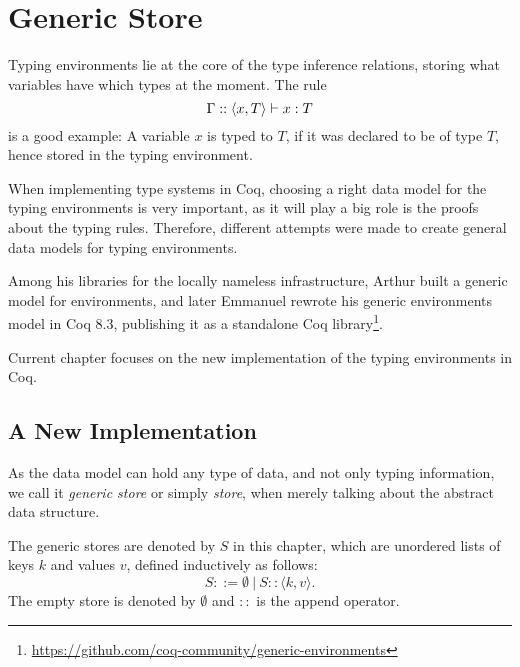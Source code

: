\section{Generic Store}\label{chap:generic-store}

\newcommand{\angkv}{\langle k, v \rangle}
\newcommand{\angkvp}{\langle k', v' \rangle}

Typing environments lie at the core of the type inference relations, storing what variables have which types at the moment. The rule
\[
\Gamma :: \left\langle x, T \right\rangle \vdash x : T
\]
is a good example: A variable $x$ is typed to $T$, if it was declared to be of type $T$, hence stored in the typing environment.

When implementing type systems in Coq, choosing a right data model for the typing environments is very important, as it will play a big role is the proofs about the typing rules. Therefore, different attempts were made to create general data models for typing environments.

Among his libraries for the locally nameless infrastructure, Arthur \cite{DBLP:journals/jar/Chargueraud12} built a generic model for environments, and later Emmanuel \cite{DBLP:journals/corr/abs-1112-1316} rewrote his generic environments model in Coq 8.3, publishing it as a standalone Coq library\footnote{\url{https://github.com/coq-community/generic-environments}}.



Current chapter focuses on the new implementation of the typing environments in Coq.

\subsection{A New Implementation}

As the data model can hold any type of data, and not only typing information, we call it \textit{generic store} or simply \textit{store}, when merely talking about the abstract data structure.

\begin{definition}
The generic stores are denoted by $S$ in this chapter, which are unordered lists of keys $k$ and values $v$, defined inductively as follows:
\begin{equation*}
S ::= \emptyset~|~S :: \angkv.
\end{equation*}
The empty store is denoted by $\emptyset$ and $::$ is the append operator.
\end{definition}

